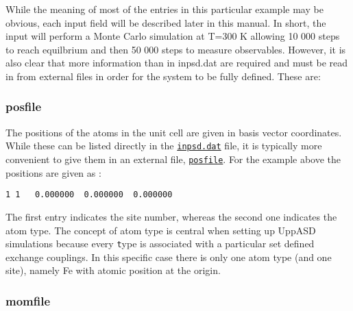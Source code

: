 \documentclass[11pt,fleqn,a4]{book} %
\newcommand{\rfilename}[1]{\hyperref[#1]{\texttt{#1}}}
\begin{document}
While the meaning of most of the entries in this particular example may be obvious, each input field will be described later in this manual. In short, the input will perform a Monte Carlo simulation at T=300 K allowing 10 000 steps to reach equilbrium and then 50 000 steps to measure observables. However,  it is also clear that more information than in inpsd.dat are required and must be read in from external files in order for the system to be fully defined. These are:

\subsubsection*{posfile}

The positions of the atoms in the unit cell are given in basis vector coordinates. While these can be listed directly in the \rfilename{inpsd.dat} file, it is typically more convenient to give them in an external file, \rfilename{posfile}. For the example above the positions are given as :

\begin{fBox} 
\begin{Verbatim} 
1 1   0.000000  0.000000  0.000000
\end{Verbatim} 
\end{fBox}

The first entry indicates the site number, whereas the second one indicates the atom type. The concept of atom type is central when setting up UppASD simulations because every {\texttt type} is associated with a particular set defined exchange couplings. In this specific case there is only one atom type (and one site), namely Fe with atomic position at the origin. 




\subsubsection*{momfile}
\end{document}
